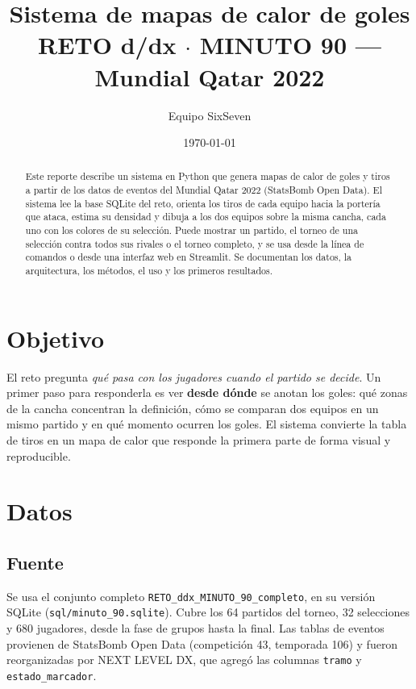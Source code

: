 \documentclass[11pt,a4paper]{article}
\title{Sistema de mapas de calor de goles\\
  \large RETO d/dx $\cdot$ MINUTO 90 --- Mundial Qatar 2022}
\author{Equipo SixSeven}
\date{\today}
\begin{document}
\maketitle

\begin{abstract}
Este reporte describe un sistema en Python que genera mapas de calor de goles y tiros
a partir de los datos de eventos del Mundial Qatar 2022 (StatsBomb Open Data).
El sistema lee la base SQLite del reto, orienta los tiros de cada equipo hacia la
portería que ataca, estima su densidad y dibuja a los dos equipos sobre la misma
cancha, cada uno con los colores de su selección. Puede mostrar un partido, el torneo
de una selección contra todos sus rivales o el torneo completo, y se usa desde la línea
de comandos o desde una interfaz web en Streamlit. Se documentan los datos, la
arquitectura, los métodos, el uso y los primeros resultados.
\end{abstract}

\tableofcontents

\section{Objetivo}

El reto pregunta \emph{qué pasa con los jugadores cuando el partido se decide}.
Un primer paso para responderla es ver \textbf{desde dónde} se anotan los goles:
qué zonas de la cancha concentran la definición, cómo se comparan dos equipos en un
mismo partido y en qué momento ocurren los goles. El sistema convierte la tabla de tiros
en un mapa de calor que responde la primera parte de forma visual y reproducible.

\section{Datos}

\subsection{Fuente}

Se usa el conjunto completo \texttt{RETO\_ddx\_MINUTO\_90\_completo}, en su versión
SQLite (\texttt{sql/minuto\_90.sqlite}). Cubre los 64 partidos del torneo,
32 selecciones y 680 jugadores, desde la fase de grupos hasta la final.
Las tablas de eventos provienen de StatsBomb Open Data (competición 43, temporada 106)
y fueron reorganizadas por NEXT LEVEL DX, que agregó las columnas \texttt{tramo}
y \texttt{estado\_marcador}.
\end{document}
